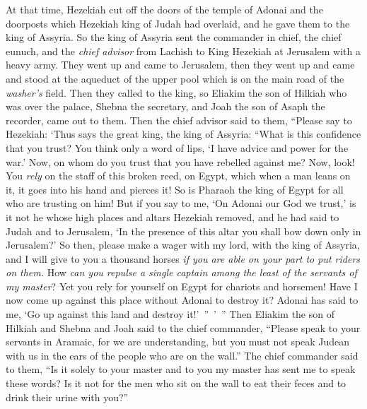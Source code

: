 \begin{biblechapter}
\verse At that time, Hezekiah cut off the doors of the temple of Adonai and the doorposts which Hezekiah king of Judah had overlaid, and he gave them to the king of Assyria.
\verse So the king of Assyria sent the commander in chief, the chief eunuch, and the \textit{chief advisor} from Lachish to King Hezekiah at Jerusalem with a heavy army. They went up and came to Jerusalem, then they went up and came and stood at the aqueduct of the upper pool which is on the main road of the \textit{washer’s} field.
\verse Then they called to the king, so Eliakim the son of Hilkiah who was over the palace, Shebna the secretary, and Joah the son of Asaph the recorder, came out to them.
 Then the chief advisor said to them, “Please say to Hezekiah: ‘Thus says the great king, the king of Assyria: “What is this confidence that you trust?
\verse You think only a word of lips, ‘I have advice and power for the war.’ Now, on whom do you trust that you have rebelled against me?
\verse Now, look! You \textit{rely} on the staff of this broken reed, on Egypt, which when a man leans on it, it goes into his hand and pierces it! So is Pharaoh the king of Egypt for all who are trusting on him!
\verse But if you say to me, ‘On Adonai our God we trust,’ is it not he whose high places and altars Hezekiah removed, and he had said to Judah and to Jerusalem, ‘In the presence of this altar you shall bow down only in Jerusalem?’
\verse So then, please make a wager with my lord, with the king of Assyria, and I will give to you a thousand horses \textit{if you are able on your part to put riders on them.}
\verse How \textit{can you repulse a single captain among the least of the servants of my master}? Yet you rely for yourself on Egypt for chariots and horsemen!
\verse Have I now come up against this place without Adonai to destroy it? Adonai has said to me, ‘Go up against this land and destroy it!’ ” ’ ”
\verse Then Eliakim the son of Hilkiah and Shebna and Joah said to the chief commander, “Please speak to your servants in Aramaic, for we are understanding, but you must not speak Judean with us in the ears of the people who are on the wall.”
\verse The chief commander said to them, “Is it solely to your master and to you my master has sent me to speak these words? Is it not for the men who sit on the wall to eat their feces and to drink their urine with you?”

\end{biblechapter}

